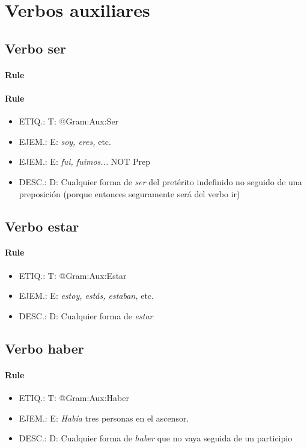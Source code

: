 \documentclass[11pt]{report}
\begin{document}
\section{Verbos auxiliares}
\subsection{Verbo ser}
\paragraph*{Rule}
\paragraph*{Rule}
\begin{itemize}
\item ETIQ.:  T: @Gram:Aux:Ser
\item EJEM.:  E: \emph{soy, eres,} etc. 
\item EJEM.:  E: \emph{fui, fuimos...} NOT Prep 
\item DESC.:  D: Cualquier forma de \emph{ser} del pretérito indefinido no seguido de una preposición (porque entonces seguramente será del verbo ir)
\end{itemize}

\subsection{Verbo estar}
\paragraph*{Rule}
\begin{itemize}
\item ETIQ.:  T: @Gram:Aux:Estar
\item EJEM.:  E: \emph{estoy, estás, estaban,} etc. 
\item DESC.:  D: Cualquier forma de \emph{estar}
\end{itemize}

\subsection{Verbo haber}
\paragraph*{Rule}
\begin{itemize}
\item ETIQ.:  T: @Gram:Aux:Haber
\item EJEM.:  E: \emph{Había} tres personas en el ascensor. 
\item DESC.:  D: Cualquier forma de \emph{haber} que no vaya seguida de un participio
\end{itemize}
\end{document}
